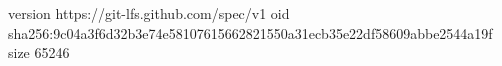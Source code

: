 version https://git-lfs.github.com/spec/v1
oid sha256:9c04a3f6d32b3e74e58107615662821550a31ecb35e22df58609abbe2544a19f
size 65246
